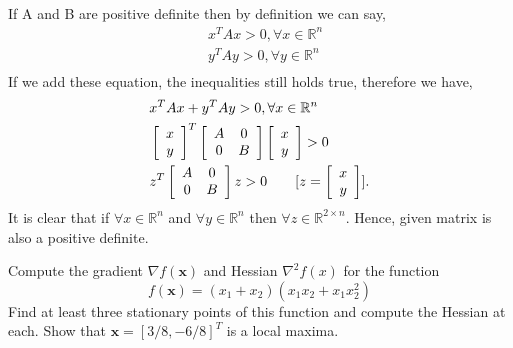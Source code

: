 \documentclass[a4paper,10pt]{article}
\newcommand{\R}{\mathbb{R}}
\begin{document}
\begin{enumerate}
    If A and B are positive definite then by definition we can say,
    \begin{equation}
    \begin{split}
        & x^{T}Ax > 0, \forall x \in \R^{n} \\
        & y^{T}Ay > 0, \forall y \in \R^{n} \\
    \end{split}
    \end{equation}
    If we add these equation, the inequalities still holds true, therefore we have,
    \begin{equation}
    \begin{split}
        & x^{T}Ax + y^{T}Ay > 0, \forall x \in \R^{n} \\
        & \left[\begin{array}{c c} x \\ y \end{array} \right]^T\left[\begin{array}{c c} A  &0 \\ 0 &B \end{array} \right]\left[\begin{array}{c c} x \\ y \end{array} \right] > 0 \\
        & z^T\left[\begin{array}{c c} A  &0 \\ 0 &B \end{array} \right]z > 0 \hspace{2em}  [z=\left[\begin{array}{c c} x \\ y \end{array} \right]].
    \end{split}
    \end{equation}
    It is clear that if $\forall x \in \R^{n}$ and  $\forall y \in \R^{n}$ then $\forall z \in \R^{2 \times n}$. Hence, given matrix is also a positive definite.
    \\
    \begin{taskbox}
    Compute the gradient $\nabla f(\mathbf{x})$ and Hessian $\nabla^2f(x)$ for the function 
    \begin{equation}
    f(\mathbf{x}) = (x_1 + x_2)(x_1x_2 + x_1 x_2^2)
    \label{eq:q3}
    \end{equation}
    Find at least three stationary points of this function  and compute the Hessian at each. Show that $\mathbf{x}=[3/8, -6/8]^T$ is a local maxima.

\end{taskbox}
\end{enumerate}
\end{document}

